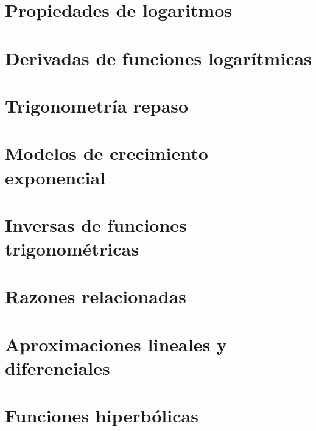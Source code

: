 \documentclass{book}
\begin{document}
\chapter{Propiedades de logaritmos}


\chapter{Derivadas de funciones logarítmicas}


\chapter{Trigonometría repaso}


\chapter{Modelos de crecimiento exponencial}



\chapter{Inversas de funciones trigonométricas}


\chapter{Razones relacionadas}


\chapter{Aproximaciones lineales y diferenciales}


\chapter{Funciones hiperbólicas}

\end{document}
